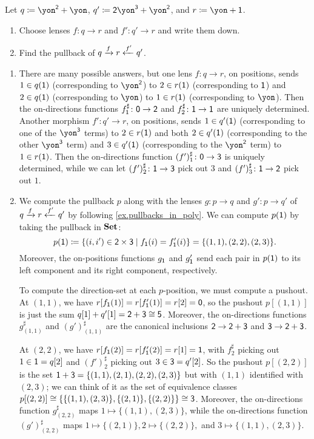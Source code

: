 \documentclass[Book-Poly]{subfiles}
\begin{document}
\begin{exercise}
Let $q\coloneqq \yon^\2+\yon$, $q'\coloneqq\2\yon^\3+\yon^\2$, and $r\coloneq\yon+\1$.
\begin{enumerate}
	\item Choose lenses $f\colon q\to r$ and $f'\colon q'\to r$ and write them down.
	\item Find the pullback of $q\xrightarrow{f} r\xleftarrow{f'} q'$.
\qedhere
\end{enumerate}
\begin{solution}
\begin{enumerate}
    \item There are many possible answers, but one lens $f \colon q \to r$, on positions, sends $1 \in q(\textsf{1})$ (corresponding to $\yon^\2$) to $2 \in r(\textsf{1})$ (corresponding to $\textsf{1}$) and $2 \in q(\textsf{1})$ (corresponding to $\yon$) to $1 \in r(\textsf{1})$ (corresponding to $\yon$).
    Then the on-directions functions $f^\sharp_{\textsf{1}} \colon \textsf{0} \to \textsf{2}$ and $f^\sharp_2 \colon \textsf{1} \to \textsf{1}$ are uniquely determined.
    Another morphism $f' \colon q' \to r$, on positions, sends $1 \in q'(\textsf{1})$ (corresponding to one of the $\yon^\3$ terms) to $2 \in r(\textsf{1})$ and both $2 \in q'(\textsf{1})$ (corresponding to the other $\yon^\3$ term) and $3 \in q'(\textsf{1})$ (corresponding to the $\yon^\2$ term) to $1 \in r(\textsf{1})$.
    Then the on-directions function $(f')^\sharp_1 \colon \textsf{0} \to \textsf{3}$ is uniquely determined, while we can let $(f')^\sharp_2 \colon \textsf{1} \to \textsf{3}$ pick out $3$ and $(f')^\sharp_3 \colon \textsf{1} \to \textsf{2}$ pick out $1$.

    \item We compute the pullback $p$ along with the lenses $g \colon p \to q$ and $g' \colon p \to q'$ of $q\xrightarrow{f} r\xleftarrow{f'} q'$ by following \cref{ex.pullbacks_in_poly}.
    We can compute $p(\textsf{1})$ by taking the pullback in $\mathbf{Set}$:
    \[
        p(\textsf{1}) \coloneqq \{(i, i') \in \textsf{2} \times \textsf{3} \mid f_{\textsf{1}}(i) = f'_{\textsf{1}}(i)\} = \{(1,1), (2,2), (2,3)\}.
    \]
    Moreover, the on-positions functions $g_{\textsf{1}}$ and $g'_{\textsf{1}}$ send each pair in $p(\textsf{1})$ to its left component and its right component, respectively.

    To compute the direction-set at each $p$-position, we must compute a pushout.
    At $(1,1)$, we have $r[f_{\textsf{1}}(1)] = r[f'_{\textsf{1}}(1)] = r[2] = \textsf{0}$, so the pushout $p[(1,1)]$ is just the sum $q[1] + q'[1] = \textsf{2} + \textsf{3} \cong \textsf{5}$.
    Moreover, the on-directions functions $g^\sharp_{(1,1)}$ and $(g')^\sharp_{(1,1)}$ are the canonical inclusions $\textsf{2} \to \textsf{2} + \textsf{3}$ and $\textsf{3} \to \textsf{2} + \textsf{3}$.

    At $(2,2)$, we have $r[f_{\textsf{1}}(2)] = r[f'_{\textsf{1}}(2)] = r[1] = \textsf{1}$, with $f^\sharp_2$ picking out $1 \in \textsf{1} = q[2]$ and $(f')^\sharp_2$ picking out $3 \in \textsf{3} = q'[2]$.
    So the pushout $p[(2,2)]$ is the set $\textsf{1} + \textsf{3} = \{(1,1), (2,1), (2,2), (2,3)\}$ but with $(1,1)$ identified with $(2,3)$; we can think of it as the set of equivalence classes $p[(2,2)] \cong \{\{(1,1), (2,3)\}, \{(2,1)\}, \{(2,2)\}\} \cong \textsf{3}$.
    Moreover, the on-directions function $g^\sharp_{(2,2)}$ maps $1 \mapsto \{(1,1), (2,3)\}$, while the on-directions function $(g')^\sharp_{(2,2)}$ maps $1 \mapsto \{(2,1)\}, 2 \mapsto \{(2,2)\},$ and $3 \mapsto \{(1,1), (2,3)\}$.


\end{enumerate}
\end{solution}
\end{exercise}
\end{document}
